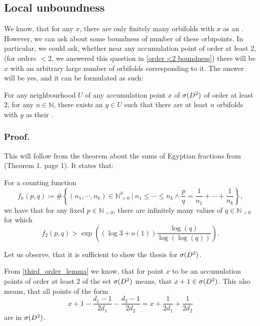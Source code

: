 \subsection{Local unboundness}
We know, that for any $x$, there are only finitely many orbifolds with $x$ as an \Eoc . 
However, we can ask about some boundness of number of these orbipoints. 
In particular, we could ask, whether near any accumulation point of order at least $2$, 
(for orders $<2$, we answered this question in \ref{order <2 boundness})
there will be $x$ with an 
arbitrary large number of orbifolds corresponding to it. 
The answer will be yes, and it can be formulated as such:
\begin{theorem}\label{unboundness}
For any neighbourhood $U$ of any accumulation point $x$ of ${{\sigma}(D^2)}$ of order at least $2$, for any 
$n\in \mathbb{N}$, 
there exists an $y\in U$ such that there are at least $n$ orbifolds with $y$ as their 
\Eoc. 
\end{theorem}
\subsubsection{Proof.}
This will follow from the theorem about the sums of Egyptian fractions from \cite{Browning2011} 
(Theorem 1. page 1).
It states that: 
\begin{theorem}
For a counting function
\begin{equation}
f_k(p,q) \coloneqq 
\#\left\{(n_1, \cdots, n_k)\in \mathbb{N}_{>0}^k\ \Big|\ n_1 \leq \cdots \leq n_k 
\land \frac{p}{q} = \frac{1}{n_1} + \cdots + \frac{1}{n_k}\right\},
\end{equation}
we have that for any fixed $p\in\mathbb{N}_{>0}$, there are infinitely many values of 
$q\in\mathbb{N}_{>0}$ for which
\begin{equation}
f_2(p,q) > \exp\left((\log{3}+o(1))\frac{\log(q)}{\log(\log(q))}\right).
\end{equation}
\end{theorem}

Let us observe, that it is sufficient to show the thesis for ${{\sigma}(D^2)}$.

From \ref{third_order_lemma} we know, that for point $x$ to be an accumulation points of order 
at least $2$ of the set ${{\sigma}(D^2)}$ means, that $x + 1 \in {{\sigma}(D^2)}$. This also means, that 
all points of the form 
\begin{equation}\label{pq condition}
x + 1 - \frac{d_1-1}{2d_1} - \frac{d_2-1}{2d_2} = x + \frac{1}{2d_1} + \frac{1}{2d_2}
\end{equation} 
are in ${{\sigma}(D^2)}$. 

